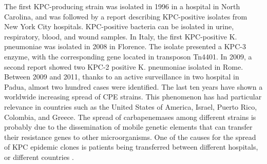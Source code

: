 \documentclass[11pt]{report}
\begin{document}
The first KPC-producing strain was isolated in 1996 in a hospital in North Carolina, and was followed by a report describing KPC-positive isolates from New York City hospitals.
KPC-positive bacteria can be isolated in urine, respiratory, blood, and wound samples.
In Italy, the first KPC-positive K. pneumoniae was isolated in 2008 in Florence.
The isolate presented a KPC-3 enzyme, with the corresponding gene located in transposon Tn4401.
In 2009, a second report showed two KPC-2 positive K. pneumoniae isolated in Rome.
Between 2009 and 2011, thanks to an active surveillance in two hospital in Padua, almost two hundred cases were identified.
\cite{MunozPrice2013}
The last ten years have shown a worldwide increasing spread of CPE strains.
This phenomenon has had particular relevance in countries such as the United States of America, Israel, Puerto Rico, Colombia, and Greece.
The spread of carbapenemases among different strains is probably due to the dissemination of mobile genetic elements that can transfer their resistance genes to other microorganisms.
One of the causes for the spread of KPC epidemic clones is patients being transferred between different hospitals, or different countries \cite{circolare2013}.
\end{document}

